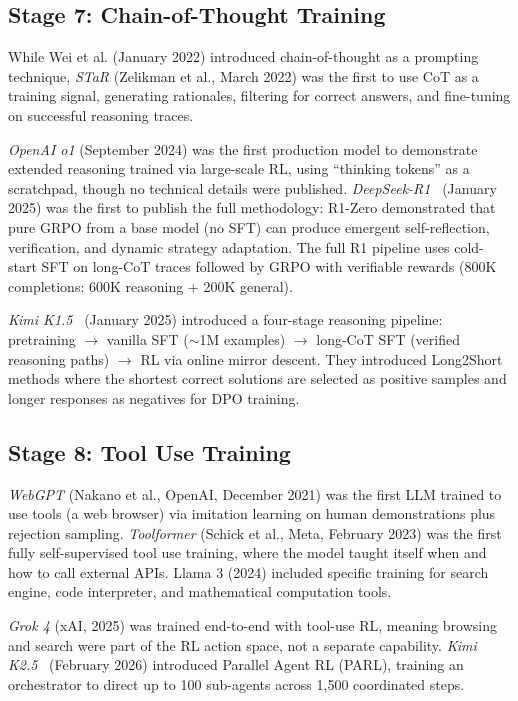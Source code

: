 \documentclass[12pt]{article}
\begin{document}
\subsection{Stage 7: Chain-of-Thought Training}

While Wei et al. (January 2022) introduced chain-of-thought as a prompting technique, \textit{STaR} (Zelikman et al., March 2022) was the first to use CoT as a training signal, generating rationales, filtering for correct answers, and fine-tuning on successful reasoning traces.

\textit{OpenAI o1} (September 2024) was the first production model to demonstrate extended reasoning trained via large-scale RL, using ``thinking tokens'' as a scratchpad, though no technical details were published. \textit{DeepSeek-R1}~\cite{Guo2025DeepSeekR1} (January 2025) was the first to publish the full methodology: R1-Zero demonstrated that pure GRPO from a base model (no SFT) can produce emergent self-reflection, verification, and dynamic strategy adaptation. The full R1 pipeline uses cold-start SFT on long-CoT traces followed by GRPO with verifiable rewards (800K completions: 600K reasoning + 200K general).

\textit{Kimi K1.5}~\cite{Kimi2025K15} (January 2025) introduced a four-stage reasoning pipeline: pretraining $\rightarrow$ vanilla SFT ($\sim$1M examples) $\rightarrow$ long-CoT SFT (verified reasoning paths) $\rightarrow$ RL via online mirror descent. They introduced Long2Short methods where the shortest correct solutions are selected as positive samples and longer responses as negatives for DPO training.

\subsection{Stage 8: Tool Use Training}

\textit{WebGPT} (Nakano et al., OpenAI, December 2021) was the first LLM trained to use tools (a web browser) via imitation learning on human demonstrations plus rejection sampling. \textit{Toolformer} (Schick et al., Meta, February 2023) was the first fully self-supervised tool use training, where the model taught itself when and how to call external APIs. Llama 3 (2024) included specific training for search engine, code interpreter, and mathematical computation tools.

\textit{Grok 4} (xAI, 2025) was trained end-to-end with tool-use RL, meaning browsing and search were part of the RL action space, not a separate capability. \textit{Kimi K2.5}~\cite{Kimi2025Researcher} (February 2026) introduced Parallel Agent RL (PARL), training an orchestrator to direct up to 100 sub-agents across 1,500 coordinated steps.
\end{document}
